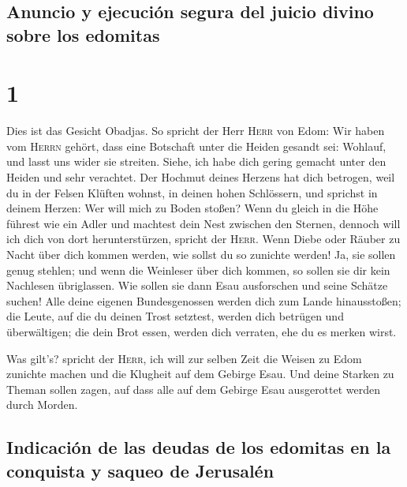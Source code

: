 \hypertarget{anuncio-y-ejecuciuxf3n-segura-del-juicio-divino-sobre-los-edomitas}{%
\subsection{Anuncio y ejecución segura del juicio divino sobre los
edomitas}\label{anuncio-y-ejecuciuxf3n-segura-del-juicio-divino-sobre-los-edomitas}}

\hypertarget{section}{%
\section{1}\label{section}}

 Dies ist das Gesicht Obadjas. So spricht der Herr
\textsc{Herr} von Edom: Wir haben vom \textsc{Herrn} gehört, dass eine
Botschaft unter die Heiden gesandt sei: Wohlauf, und lasst uns wider sie
streiten.  Siehe, ich habe dich gering gemacht unter den
Heiden und sehr verachtet.  Der Hochmut deines Herzens hat
dich betrogen, weil du in der Felsen Klüften wohnst, in deinen hohen
Schlössern, und sprichst in deinem Herzen: Wer will mich zu Boden
stoßen?  Wenn du gleich in die Höhe führest wie ein Adler
und machtest dein Nest zwischen den Sternen, dennoch will ich dich von
dort herunterstürzen, spricht der \textsc{Herr}.  Wenn
Diebe oder Räuber zu Nacht über dich kommen werden, wie sollst du so
zunichte werden! Ja, sie sollen genug stehlen; und wenn die Weinleser
über dich kommen, so sollen sie dir kein Nachlesen übriglassen.
 Wie sollen sie dann Esau ausforschen und seine Schätze
suchen!  Alle deine eigenen Bundesgenossen werden dich zum
Lande hinausstoßen; die Leute, auf die du deinen Trost setztest, werden
dich betrügen und überwältigen; die dein Brot essen, werden dich
verraten, ehe du es merken wirst.

 Was gilt's? spricht der \textsc{Herr}, ich will zur
selben Zeit die Weisen zu Edom zunichte machen und die Klugheit auf dem
Gebirge Esau.  Und deine Starken zu Theman sollen zagen,
auf dass alle auf dem Gebirge Esau ausgerottet werden durch Morden.

\hypertarget{indicaciuxf3n-de-las-deudas-de-los-edomitas-en-la-conquista-y-saqueo-de-jerusaluxe9n}{%
\subsection{Indicación de las deudas de los edomitas en la conquista y
saqueo de
Jerusalén}\label{indicaciuxf3n-de-las-deudas-de-los-edomitas-en-la-conquista-y-saqueo-de-jerusaluxe9n}}

